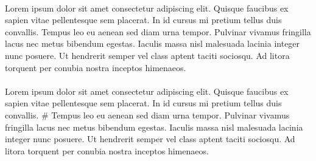 \\
Lorem ipsum dolor sit amet consectetur adipiscing elit. Quisque faucibus ex sapien vitae pellentesque sem placerat. In id cursus mi pretium tellus duis convallis. Tempus leo eu aenean sed diam urna tempor. Pulvinar vivamus fringilla lacus nec metus bibendum egestas. Iaculis massa nisl malesuada lacinia integer nunc posuere. Ut hendrerit semper vel class aptent taciti sociosqu. Ad litora torquent per conubia nostra inceptos himenaeos.\\
\\
Lorem ipsum dolor sit amet consectetur adipiscing elit. Quisque faucibus ex sapien vitae pellentesque sem placerat. In id cursus mi pretium tellus duis convallis. \# Tempus leo eu aenean sed diam urna tempor. Pulvinar vivamus fringilla lacus nec metus bibendum egestas. Iaculis massa nisl malesuada lacinia integer nunc posuere. Ut hendrerit semper vel class aptent taciti sociosqu. Ad litora torquent per conubia nostra inceptos himenaeos.\\
